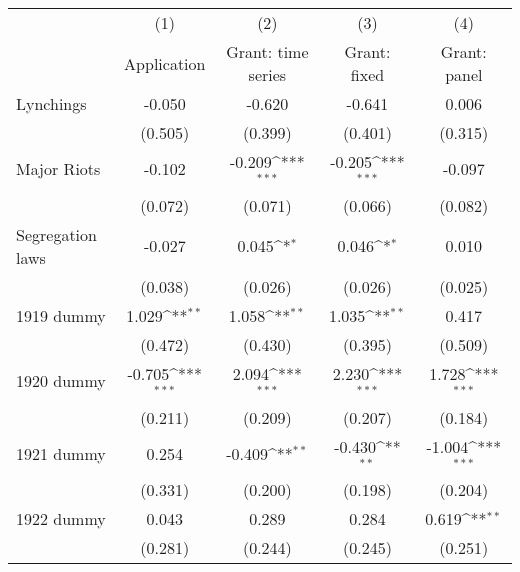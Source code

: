 {
\def\sym#1{\ifmmode^{#1}\else\(^{#1}\)\fi}
\begin{tabular}{l*{4}{c}}
\hline\hline
                    &\multicolumn{1}{c}{(1)}&\multicolumn{1}{c}{(2)}&\multicolumn{1}{c}{(3)}&\multicolumn{1}{c}{(4)}\\
                    &\multicolumn{1}{c}{Application}&\multicolumn{1}{c}{Grant: time series}&\multicolumn{1}{c}{Grant: fixed}&\multicolumn{1}{c}{Grant: panel}\\
\hline
Lynchings           &      -0.050         &      -0.620         &      -0.641         &       0.006         \\
                    &     (0.505)         &     (0.399)         &     (0.401)         &     (0.315)         \\
[1em]
Major Riots         &      -0.102         &      -0.209\sym{***}&      -0.205\sym{***}&      -0.097         \\
                    &     (0.072)         &     (0.071)         &     (0.066)         &     (0.082)         \\
[1em]
Segregation laws    &      -0.027         &       0.045\sym{*}  &       0.046\sym{*}  &       0.010         \\
                    &     (0.038)         &     (0.026)         &     (0.026)         &     (0.025)         \\
[1em]
1919 dummy          &       1.029\sym{**} &       1.058\sym{**} &       1.035\sym{**} &       0.417         \\
                    &     (0.472)         &     (0.430)         &     (0.395)         &     (0.509)         \\
[1em]
1920 dummy          &      -0.705\sym{***}&       2.094\sym{***}&       2.230\sym{***}&       1.728\sym{***}\\
                    &     (0.211)         &     (0.209)         &     (0.207)         &     (0.184)         \\
[1em]
1921 dummy          &       0.254         &      -0.409\sym{**} &      -0.430\sym{**} &      -1.004\sym{***}\\
                    &     (0.331)         &     (0.200)         &     (0.198)         &     (0.204)         \\
[1em]
1922 dummy          &       0.043         &       0.289         &       0.284         &       0.619\sym{**} \\
                    &     (0.281)         &     (0.244)         &     (0.245)         &     (0.251)         \\

\end{tabular}}
